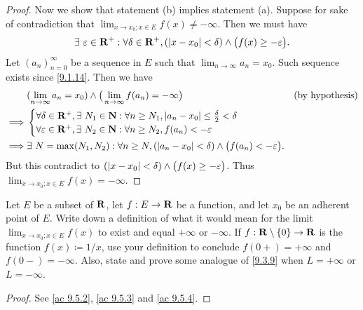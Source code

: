 \begin{proof}
  Now we show that statement (b) implies statement (a).
  Suppose for sake of contradiction that \(\lim_{x \to x_0 ; x \in E} f(x) \neq -\infty\).
  Then we must have
  \[
    \exists\ \varepsilon \in \mathbf{R}^+ : \forall \delta \in \mathbf{R}^+, (\left\lvert x - x_0\right\rvert < \delta) \land \big(f(x) \geq -\varepsilon\big).
  \]
  Let \((a_n)_{n = 0}^\infty\) be a sequence in \(E\) such that \(\lim_{n \to \infty} a_n = x_0\).
  Such sequence exists since \cref{9.1.14}.
  Then we have
  \begin{align*}
             & (\lim_{n \to \infty} a_n = x_0) \land \big(\lim_{n \to \infty} f(a_n) = -\infty\big)                                 & \text{(by hypothesis)} \\
    \implies & \begin{cases}
                 \forall \delta \in \mathbf{R}^+, \exists\ N_1 \in \mathbf{N} : \forall n \geq N_1, \left\lvert a_n - x_0\right\rvert \leq \frac{\delta}{2} < \delta \\
                 \forall \varepsilon \in \mathbf{R}^+, \exists\ N_2 \in \mathbf{N} : \forall n \geq N_2, f(a_n) < -\varepsilon
               \end{cases}                             \\
    \implies & \exists\ N = \max(N_1, N_2) : \forall n \geq N, (\left\lvert a_n - x_0\right\rvert < \delta) \land \big(f(a_n) < -\varepsilon\big).
  \end{align*}
  But this contradict to \((\left\lvert x - x_0\right\rvert < \delta) \land \big(f(x) \geq -\varepsilon\big)\).
  Thus \(\lim_{x \to x_0 ; x \in E} f(x) = -\infty\).
\end{proof}

\exercisesection

\begin{exercise}\label{ex 9.5.1}
  Let \(E\) be a subset of \(\mathbf{R}\), let \(f : E \to \mathbf{R}\) be a function, and let \(x_0\) be an adherent point of \(E\).
  Write down a definition of what it would mean for the limit \(\lim_{x \to x_0 ; x \in E} f(x)\) to exist and equal \(+\infty\) or \(-\infty\).
  If \(f : \mathbf{R} \setminus \{0\} \to \mathbf{R}\) is the function \(f(x) \coloneqq 1 / x\), use your definition to conclude \(f(0+) = +\infty\) and \(f(0-) = -\infty\).
  Also, state and prove some analogue of \cref{9.3.9} when \(L = +\infty\) or \(L = -\infty\).
\end{exercise}

\begin{proof}
  See \cref{ac 9.5.2}, \cref{ac 9.5.3} and \cref{ac 9.5.4}.
\end{proof}